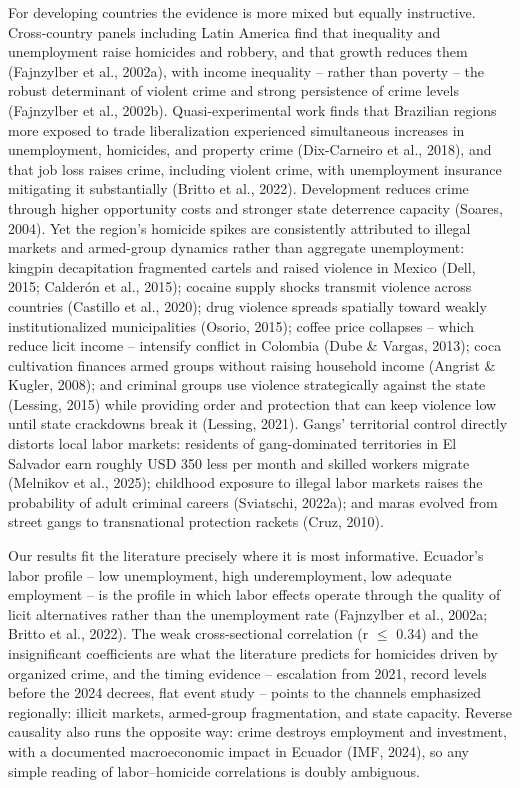 For developing countries the evidence is more mixed but equally instructive. Cross-country panels including Latin America find that inequality and unemployment raise homicides and robbery, and that growth reduces them (Fajnzylber et al., 2002a), with income inequality -- rather than poverty -- the robust determinant of violent crime and strong persistence of crime levels (Fajnzylber et al., 2002b). Quasi-experimental work finds that Brazilian regions more exposed to trade liberalization experienced simultaneous increases in unemployment, homicides, and property crime (Dix-Carneiro et al., 2018), and that job loss raises crime, including violent crime, with unemployment insurance mitigating it substantially (Britto et al., 2022). Development reduces crime through higher opportunity costs and stronger state deterrence capacity (Soares, 2004). Yet the region's homicide spikes are consistently attributed to illegal markets and armed-group dynamics rather than aggregate unemployment: kingpin decapitation fragmented cartels and raised violence in Mexico (Dell, 2015; Calderón et al., 2015); cocaine supply shocks transmit violence across countries (Castillo et al., 2020); drug violence spreads spatially toward weakly institutionalized municipalities (Osorio, 2015); coffee price collapses -- which reduce licit income -- intensify conflict in Colombia (Dube \& Vargas, 2013); coca cultivation finances armed groups without raising household income (Angrist \& Kugler, 2008); and criminal groups use violence strategically against the state (Lessing, 2015) while providing order and protection that can keep violence low until state crackdowns break it (Lessing, 2021). Gangs' territorial control directly distorts local labor markets: residents of gang-dominated territories in El Salvador earn roughly USD 350 less per month and skilled workers migrate (Melnikov et al., 2025); childhood exposure to illegal labor markets raises the probability of adult criminal careers (Sviatschi, 2022a); and maras evolved from street gangs to transnational protection rackets (Cruz, 2010).


Our results fit the literature precisely where it is most informative. Ecuador's labor profile -- low unemployment, high underemployment, low adequate employment -- is the profile in which labor effects operate through the quality of licit alternatives rather than the unemployment rate (Fajnzylber et al., 2002a; Britto et al., 2022). The weak cross-sectional correlation (r $\leq$ 0.34) and the insignificant coefficients are what the literature predicts for homicides driven by organized crime, and the timing evidence -- escalation from 2021, record levels before the 2024 decrees, flat event study -- points to the channels emphasized regionally: illicit markets, armed-group fragmentation, and state capacity. Reverse causality also runs the opposite way: crime destroys employment and investment, with a documented macroeconomic impact in Ecuador (IMF, 2024), so any simple reading of labor--homicide correlations is doubly ambiguous.



